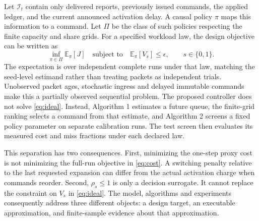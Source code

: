 \documentclass{IEEEoj}
\begin{document}
Let $\mathcal I_t$ contain only delivered reports, previously issued commands,
the applied ledger, and the current announced activation delay. A causal policy
$\pi$ maps this information to a command. Let $\Pi$ be the class of such policies
respecting the finite capacity and share grids. For a specified workload law,
the design objective can be written as
\begin{equation}
 \inf_{\pi\in\Pi}\mathbb E_\pi[J]
 \quad\text{subject to}\quad\mathbb E_\pi[V_s]\le\epsilon,
 \qquad s\in\{0,1\}.\label{eq:ideal}
\end{equation}
The expectation is over independent complete runs under that law, matching
the seed-level estimand rather than treating packets as independent trials.
Unobserved packet ages, stochastic ingress and delayed immutable commands
make this a partially observed sequential problem. The proposed controller
does not solve \eqref{eq:ideal}. Instead, Algorithm 1 estimates a future queue,
the finite-grid ranking selects a command from that estimate, and Algorithm 2
screens a fixed policy parameter on separate calibration runs. The test screen
then evaluates its measured cost and miss fractions under each declared law.

This separation has two consequences. First, minimizing the one-step proxy
cost is not minimizing the full-run objective in \eqref{eq:cost}. A switching
penalty relative to the last requested expansion can differ from the actual
activation charge when commands reorder. Second, $\rho_s\le1$ is only a
decision surrogate. It cannot replace the constraint on $V_s$ in
\eqref{eq:ideal}. The model, algorithms and experiments consequently address
three different objects: a design target, an executable approximation, and
finite-sample evidence about that approximation.
\end{document}

